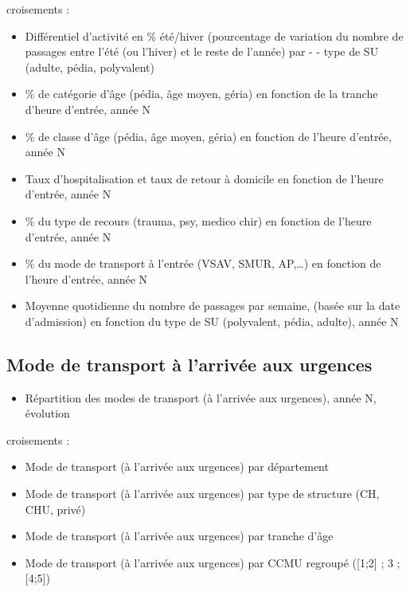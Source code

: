 \documentclass[]{article}
\begin{document}
croisements :

\begin{itemize}
\itemsep1pt\parskip0pt
\item
  Différentiel d'activité en \% été/hiver (pourcentage de variation du
  nombre de passages entre l'été (ou l'hiver) et le reste de l'année)
  par - - type de SU (adulte, pédia, polyvalent)
\item
  \% de catégorie d'âge (pédia, âge moyen, géria) en fonction de la
  tranche d'heure d'entrée, année N
\item
  \% de classe d'âge (pédia, âge moyen, géria) en fonction de l'heure
  d'entrée, année N
\item
  Taux d'hospitalisation et taux de retour à domicile en fonction de
  l'heure d'entrée, année N
\item
  \% du type de recours (trauma, psy, medico chir) en fonction de
  l'heure d'entrée, année N
\item
  \% du mode de transport à l'entrée (VSAV, SMUR, AP,\ldots{}) en
  fonction de l'heure d'entrée, année N
\item
  Moyenne quotidienne du nombre de passages par semaine, (basée sur la
  date d'admission) en fonction du type de SU (polyvalent, pédia,
  adulte), année N
\end{itemize}

\subsection{Mode de transport à l'arrivée aux
urgences}\label{mode-de-transport-a-larrivee-aux-urgences}

\begin{itemize}
\itemsep1pt\parskip0pt
\item
  Répartition des modes de transport (à l'arrivée aux urgences), année
  N, évolution
\end{itemize}

croisements :

\begin{itemize}
\itemsep1pt\parskip0pt
\item
  Mode de transport (à l'arrivée aux urgences) par département
\item
  Mode de transport (à l'arrivée aux urgences) par type de structure
  (CH, CHU, privé)
\item
  Mode de transport (à l'arrivée aux urgences) par tranche d'âge
\item
  Mode de transport (à l'arrivée aux urgences) par CCMU regroupé
  ({[}1;2{]} ; 3 ; {[}4;5{]})
\end{itemize}
\end{document}
